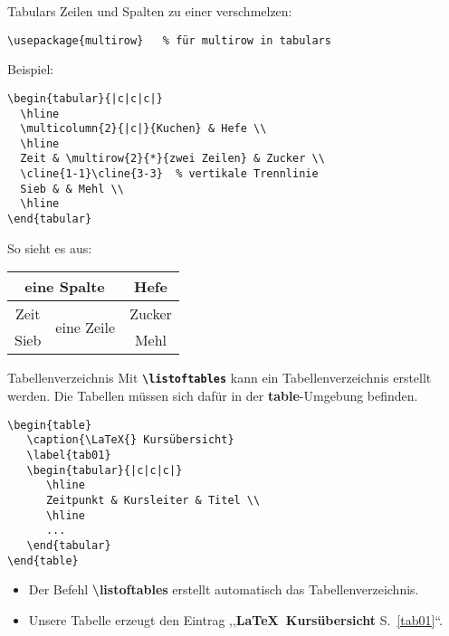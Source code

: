\begin{frame}[fragile]{Tabulars}
Zeilen und Spalten zu einer verschmelzen:

\begin{lstlisting}[style=tex]
\usepackage{multirow}   % für multirow in tabulars
\end{lstlisting}%

Beispiel:
\begin{lstlisting}[style=tex]
\begin{tabular}{|c|c|c|}
  \hline
  \multicolumn{2}{|c|}{Kuchen} & Hefe \\
  \hline
  Zeit & \multirow{2}{*}{zwei Zeilen} & Zucker \\
  \cline{1-1}\cline{3-3}  % vertikale Trennlinie
  Sieb & & Mehl \\
  \hline
\end{tabular}
\end{lstlisting}

So sieht es aus:
\renewcommand{\arraystretch}{1.2}
\begin{tabular}{|c|c|c|}
\hline
\multicolumn{2}{|c|}{eine Spalte} & Hefe \\
\hline
Zeit & \multirow{2}{*}{eine Zeile} & Zucker \\
\cline{1-1}\cline{3-3}
Sieb & & Mehl \\
\hline
\end{tabular}
\end{frame}

\begin{frame}[fragile]{Tabellenverzeichnis}
Mit \textbf{\texttt{\textbackslash listoftables}} kann ein Tabellenverzeichnis erstellt werden.
Die Tabellen müssen sich dafür in der \textbf{table}-Umgebung befinden.

\begin{lstlisting}[style=tex]
\begin{table}
   \caption{\LaTeX{} Kursübersicht}
   \label{tab01}
   \begin{tabular}{|c|c|c|}
      \hline
      Zeitpunkt & Kursleiter & Titel \\
      \hline 
      ...   
   \end{tabular}
\end{table}
\end{lstlisting}\label{tab01}%

\begin{itemize}
\item Der Befehl \textbf{\textbackslash listoftables} erstellt automatisch das Tabellenverzeichnis.
\item Unsere Tabelle erzeugt den Eintrag ,,\textbf{\LaTeX{}~Kursübersicht} S.~\ref{tab01}``.
\end{itemize}
\end{frame}


